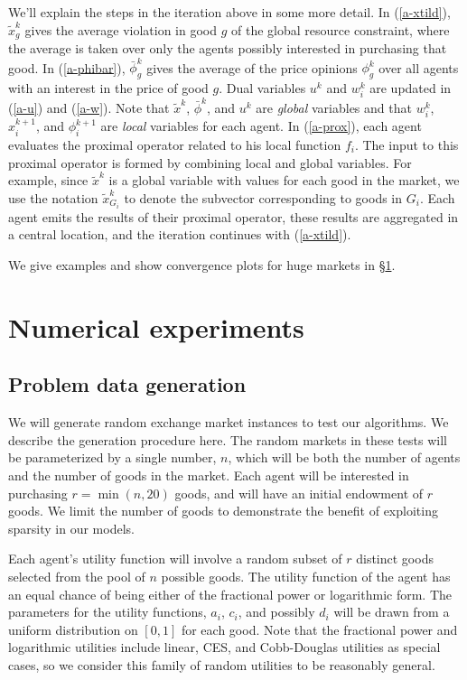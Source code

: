\documentclass[12pt]{article}
\begin{document}
We'll explain the steps in the iteration above in some more detail. In (\ref{a-xtild}),
$\tilde{x}^k_g$ gives the average violation in good $g$ of the global resource
constraint, where the average is taken over only the agents possibly interested
in purchasing that good. In (\ref{a-phibar}), $\bar{\phi}^k_g$ gives the
average of the price opinions $\phi^k_g$ over all agents with an interest in
the price of good $g$. Dual variables $u^k$ and $w^k_i$ are updated in
(\ref{a-u}) and (\ref{a-w}). Note that $\tilde{x}^k$, $\bar{\phi}^k$, and $u^k$
are \emph{global} variables and that $w_i^k$, $x_i^{k+1}$, and $\phi_i^{k+1}$
are \emph{local} variables for each agent. In (\ref{a-prox}), each
agent evaluates the proximal operator related to his local function $f_i$. The
input to this proximal operator is formed by combining local and global
variables. For example, since $\tilde{x}^k$ is a global variable with values
for each good in the market, we use the notation $\tilde{x}^k_{G_i}$ to denote
the subvector corresponding to goods in $G_i$. Each agent emits the results of
their proximal operator, these results are aggregated
in a central location, and the iteration continues with (\ref{a-xtild}).

We give examples and show convergence plots for huge markets in
\S\ref{sec:examples}.


\section{Numerical experiments}
\label{sec:examples}
\subsection{Problem data generation}
\label{sec:random_prob}

We will generate random exchange market instances to test our algorithms. We
describe the generation procedure here. The random markets in these tests will
be parameterized by a single number, $n$, which will be both the number of
agents and the number of goods in the market. Each agent will be interested in
purchasing $r = \min(n,20)$ goods, and will have an initial endowment of $r$
goods. We limit the number of goods to demonstrate the benefit of exploiting
sparsity in our models.

Each agent's utility function will involve
a random subset of $r$ distinct
goods selected from the pool of $n$ possible goods. The utility function of the agent
has an equal chance of  being either of the fractional power or logarithmic
form. The parameters for the utility functions, $a_i$, $c_i$, and possibly
$d_i$ will be drawn from a uniform distribution on $[0,1]$ for each good. Note
that the fractional power and logarithmic utilities include linear, CES, and
Cobb-Douglas utilities as special cases, so we consider this family of random
utilities to be reasonably general.
\end{document}
